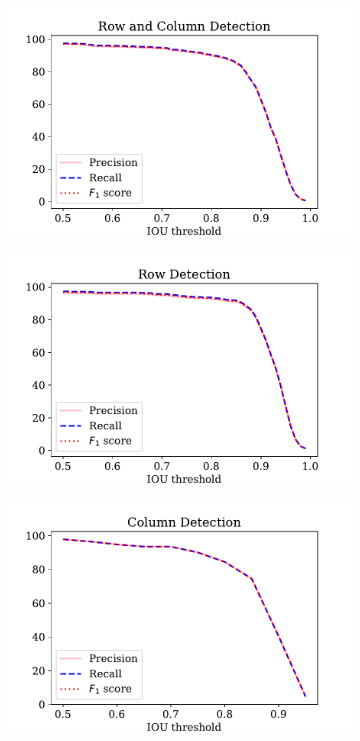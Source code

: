 \begin{figure}[h!]
\centering
\begin{subfigure}{0.325\linewidth}
  \centering
  \includegraphics[width=\linewidth]{row_col_pRf.pdf}
    \caption{}
    \label{}
\end{subfigure}
\begin{subfigure}{0.325\linewidth}
  \centering
  \includegraphics[width=\linewidth]{row_pRf.pdf}
    \caption{}
    \label{}
\end{subfigure}
\begin{subfigure}{0.325\linewidth}
  \centering
  \includegraphics[width=\linewidth]{col_pRf.pdf}

\end{subfigure}
\end{figure}
